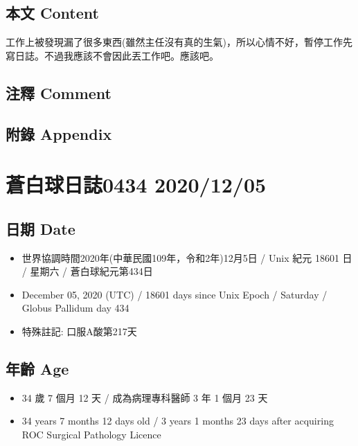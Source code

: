 \documentclass[a5paper, 10pt
]{book}
\providecommand{\tightlist}{%
  \setlength{\itemsep}{0pt}\setlength{\parskip}{0pt}}
\begin{document}
\hypertarget{ux672cux6587-content-3}{%
\subsection{本文 Content}\label{ux672cux6587-content-3}}

工作上被發現漏了很多東西(雖然主任沒有真的生氣)，所以心情不好，暫停工作先寫日誌。不過我應該不會因此丟工作吧。應該吧。

\hypertarget{ux6ce8ux91cb-comment-3}{%
\subsection{注釋 Comment}\label{ux6ce8ux91cb-comment-3}}

\hypertarget{ux9644ux9304-appendix-3}{%
\subsection{附錄 Appendix}\label{ux9644ux9304-appendix-3}}

\hypertarget{ux84bcux767dux7403ux65e5ux8a8c0434-20201205}{%
\section{蒼白球日誌0434
2020/12/05}\label{ux84bcux767dux7403ux65e5ux8a8c0434-20201205}}

\hypertarget{ux65e5ux671f-date-4}{%
\subsection{日期 Date}\label{ux65e5ux671f-date-4}}

\begin{itemize}
\tightlist
\item
  世界協調時間2020年(中華民國109年，令和2年)12月5日 / Unix 紀元 18601 日
  / 星期六 / 蒼白球紀元第434日
\item
  December 05, 2020 (UTC) / 18601 days since Unix Epoch / Saturday /
  Globus Pallidum day 434
\item
  特殊註記: 口服A酸第217天
\end{itemize}

\hypertarget{ux5e74ux9f61-age-4}{%
\subsection{年齡 Age}\label{ux5e74ux9f61-age-4}}

\begin{itemize}
\tightlist
\item
  34 歲 7 個月 12 天 / 成為病理專科醫師 3 年 1 個月 23 天
\item
  34 years 7 months 12 days old / 3 years 1 months 23 days after
  acquiring ROC Surgical Pathology Licence
\end{itemize}
\end{document}
